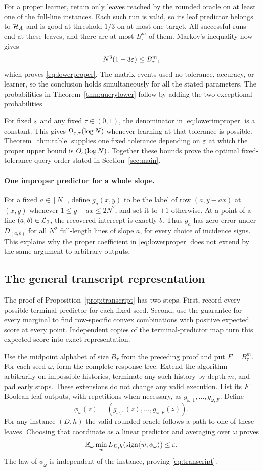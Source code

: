 For a proper learner, retain only leaves reached by the rounded oracle on at least one of the full-line instances. Each such run is valid, so its leaf predictor belongs to $\mathcal H_A$ and is good at threshold $1/3$ on at most one target. All successful runs end at these leaves, and there are at most $B_\tau^m$ of them. Markov's inequality now gives
\[
 N^3(1-3\varepsilon)\le B_\tau^m,
\]
which proves \eqref{eq:lowerproper}. The matrix events used no tolerance, accuracy, or learner, so the conclusion holds simultaneously for all the stated parameters. The probabilities in Theorem~\ref{thm:querylower} follow by adding the two exceptional probabilities.

For fixed $\varepsilon$ and any fixed $\tau\in(0,1)$, the denominator in \eqref{eq:lowerimproper} is a constant. This gives $\Omega_{\varepsilon,\tau}(\log N)$ whenever learning at that tolerance is possible. Theorem~\ref{thm:table} supplies one fixed tolerance depending on $\varepsilon$ at which the proper upper bound is $O_\varepsilon(\log N)$. Together these bounds prove the optimal fixed-tolerance query order stated in Section~\ref{sec:main}.

\paragraph{One improper predictor for a whole slope.}
For a fixed $a\in[N]$, define $g_a(x,y)$ to be the label of row $(a,y-ax)$ at $(x,y)$ whenever $1\le y-ax\le2N^2$, and set it to $+1$ otherwise. At a point of a line $(a,b)\in\mathcal L_0$, the recovered intercept is exactly $b$. Thus $g_a$ has zero error under $D_{(a,b)}$ for all $N^2$ full-length lines of slope $a$, for every choice of incidence signs. This explains why the proper coefficient in \eqref{eq:lowerproper} does not extend by the same argument to arbitrary outputs.

\subsection{The general transcript representation}
The proof of Proposition~\ref{prop:transcript} has two steps. First, record every possible terminal predictor for each fixed seed. Second, use the guarantee for every marginal to find row-specific convex combinations with positive expected score at every point. Independent copies of the terminal-predictor map turn this expected score into exact representation.

Use the midpoint alphabet of size $B_\tau$ from the preceding proof and put $F=B_\tau^m$. For each seed $\omega$, form the complete response tree. Extend the algorithm arbitrarily on impossible histories, terminate any such history by depth $m$, and pad early stops. These extensions do not change any valid execution. List its $F$ Boolean leaf outputs, with repetitions when necessary, as $g_{\omega,1},\ldots,g_{\omega,F}$. Define
\[
 \phi_\omega(z)=(g_{\omega,1}(z),\ldots,g_{\omega,F}(z)).
\]
For any instance $(D,h)$ the valid rounded oracle follows a path to one of these leaves. Choosing that coordinate as a linear predictor and averaging over $\omega$ proves
\[
 \mathbb E_\omega\min_wL_{D,h}(\operatorname{sign}\langle w,\phi_\omega\rangle)\le\varepsilon.
\]
The law of $\phi_\omega$ is independent of the instance, proving \eqref{eq:transcript}.

